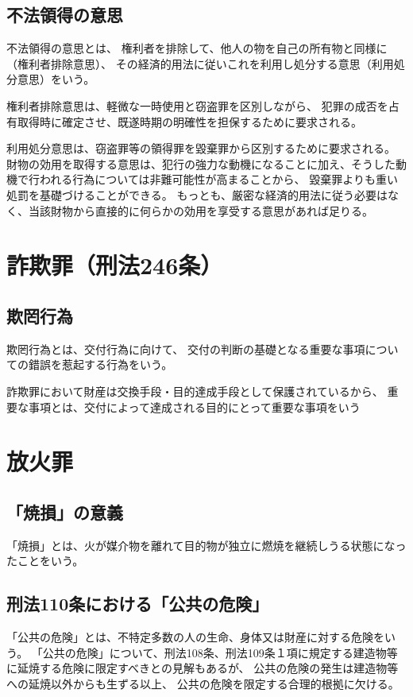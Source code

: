 \documentclass[11pt]{jsarticle}
\begin{document}
		\subsection{不法領得の意思}
			不法領得の意思とは、
			権利者を排除して、他人の物を自己の所有物と同様に（権利者排除意思）、
			その経済的用法に従いこれを利用し処分する意思（利用処分意思）をいう。
			
			権利者排除意思は、軽微な一時使用と窃盗罪を区別しながら、
			犯罪の成否を占有取得時に確定させ、既遂時期の明確性を担保するために要求される。
			
			利用処分意思は、窃盗罪等の領得罪を毀棄罪から区別するために要求される。
			財物の効用を取得する意思は、犯行の強力な動機になることに加え、そうした動機で行われる行為については非難可能性が高まることから、
			毀棄罪よりも重い処罰を基礎づけることができる。
			もっとも、厳密な経済的用法に従う必要はなく、当該財物から直接的に何らかの効用を享受する意思があれば足りる。
			
	\section{詐欺罪（刑法246条）}
		\subsection{欺罔行為}
			欺罔行為とは、交付行為に向けて、
			交付の判断の基礎となる重要な事項についての錯誤を惹起する行為をいう。
			
			詐欺罪において財産は交換手段・目的達成手段として保護されているから、
			重要な事項とは、交付によって達成される目的にとって重要な事項をいう
		
			
	
	\section{放火罪}
		\subsection{「焼損」の意義}
			「焼損」とは、火が媒介物を離れて目的物が独立に燃焼を継続しうる状態になったことをいう。
			
		\subsection{刑法110条における「公共の危険」}
			「公共の危険」とは、不特定多数の人の生命、身体又は財産に対する危険をいう。
			「公共の危険」について、刑法108条、刑法109条１項に規定する建造物等に延焼する危険に限定すべきとの見解もあるが、
			公共の危険の発生は建造物等への延焼以外からも生ずる以上、
			公共の危険を限定する合理的根拠に欠ける。
			
\end{document}
